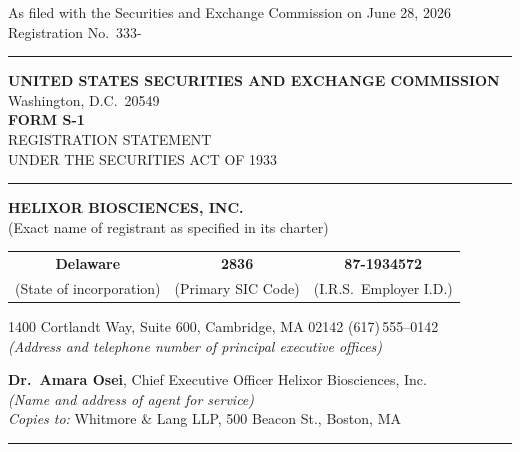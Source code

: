 \documentclass[10pt]{article}
\begin{document}
\begin{center}
{\footnotesize As filed with the Securities and Exchange Commission on June 28, 2026}\\[2pt]
{\footnotesize Registration No.\ 333-\underline{\hspace{1.6cm}}}
\end{center}
\vspace{2pt}
{\color{rule}\rule{\linewidth}{1.2pt}}
\begin{center}
{\large\bfseries UNITED STATES SECURITIES AND EXCHANGE COMMISSION}\\[2pt]
Washington, D.C.\ 20549\\[8pt]
{\LARGE\bfseries FORM S-1}\\[4pt]
{\normalsize REGISTRATION STATEMENT\\ UNDER THE SECURITIES ACT OF 1933}
\end{center}
{\color{rule}\rule{\linewidth}{1.2pt}}

\vspace{6pt}
\begin{center}
{\Large\bfseries HELIXOR BIOSCIENCES, INC.}\\[2pt]
{\small (Exact name of registrant as specified in its charter)}
\end{center}

\begin{tabularx}{\linewidth}{@{}CCC@{}}
\textbf{Delaware} & \textbf{2836} & \textbf{87-1934572}\\
{\footnotesize (State of incorporation)} & {\footnotesize (Primary SIC Code)} &
{\footnotesize (I.R.S.\ Employer I.D.)}\\
\end{tabularx}

\begin{center}\small
1400 Cortlandt Way, Suite 600, Cambridge, MA 02142 \;\textbullet\; (617)\,555--0142\\
\textit{(Address and telephone number of principal executive offices)}
\end{center}

\vspace{2pt}{\color{rule}\rule{\linewidth}{0.6pt}}
\begin{center}\small
\textbf{Dr.\ Amara Osei}, Chief Executive Officer \;\textbullet\; Helixor Biosciences, Inc.\\
\textit{(Name and address of agent for service)}\\[3pt]
\textit{Copies to:} Whitmore \& Lang LLP, 500 Beacon St., Boston, MA
\end{center}
{\color{rule}\rule{\linewidth}{0.6pt}}
\end{document}
